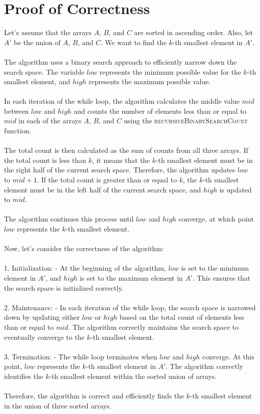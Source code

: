 \documentclass{article}
\begin{document}
\section{Proof of Correctness}
Let's assume that the arrays $A$, $B$, and $C$ are sorted in ascending order. Also, let $A'$ be the union of $A$, $B$, and $C$. We want to find the $k$-th smallest element in $A'$.
\\\\
The algorithm uses a binary search approach to efficiently narrow down the search space. The variable $low$ represents the minimum possible value for the $k$-th smallest element, and $high$ represents the maximum possible value.
\\\\
In each iteration of the while loop, the algorithm calculates the middle value $mid$ between $low$ and $high$ and counts the number of elements less than or equal to $mid$ in each of the arrays $A$, $B$, and $C$ using the \textsc{recursiveBinarySearchCount} function.
\\\\
The total count is then calculated as the sum of counts from all three arrays. If the total count is less than $k$, it means that the $k$-th smallest element must be in the right half of the current search space. Therefore, the algorithm updates $low$ to $mid + 1$. If the total count is greater than or equal to $k$, the $k$-th smallest element must be in the left half of the current search space, and $high$ is updated to $mid$.
\\\\
The algorithm continues this process until $low$ and $high$ converge, at which point $low$ represents the $k$-th smallest element.
\\\\
Now, let's consider the correctness of the algorithm:
\\\\
1. Initialization:
   - At the beginning of the algorithm, $low$ is set to the minimum element in $A'$, and $high$ is set to the maximum element in $A'$. This ensures that the search space is initialized correctly.
\\\\
2. Maintenance:
   - In each iteration of the while loop, the search space is narrowed down by updating either $low$ or $high$ based on the total count of elements less than or equal to $mid$. The algorithm correctly maintains the search space to eventually converge to the $k$-th smallest element.
\\\\
3. Termination:
   - The while loop terminates when $low$ and $high$ converge. At this point, $low$ represents the $k$-th smallest element in $A'$. The algorithm correctly identifies the $k$-th smallest element within the sorted union of arrays.
\\\\
Therefore, the algorithm is correct and efficiently finds the $k$-th smallest element in the union of three sorted arrays.
\end{document}

